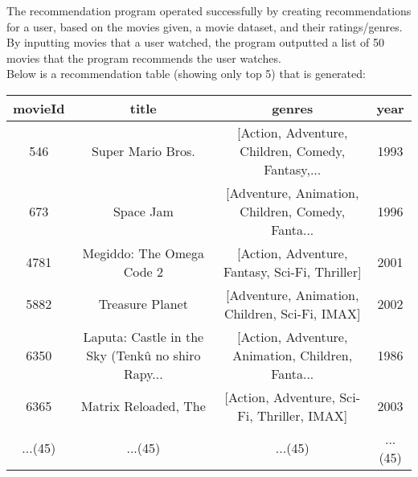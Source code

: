 \documentclass{article}
\begin{document}
The recommendation program operated successfully by creating recommendations for a user, based on the movies 
given, a movie dataset, and their ratings/genres. By inputting movies that a user watched, the program outputted
a list of 50 movies that the program recommends the user watches.\\
Below is a recommendation table (showing only top 5) that is generated: 
\begin{center}
    \begin{adjustwidth}{-3.5cm}{}
    \begin{tabular}{||c c c c||}
        \hline
        movieId & title & genres & year \\ [0.5ex] 
        \hline\hline
        546 & Super Mario Bros. & [Action, Adventure, Children, Comedy, Fantasy,... & 1993 \\ 
        \hline
        673 & Space Jam & [Adventure, Animation, Children, Comedy, Fanta... & 1996 \\ 
        \hline
        4781 & Megiddo: The Omega Code 2 & [Action, Adventure, Fantasy, Sci-Fi, Thriller] & 2001 \\ 
        \hline
        5882 & Treasure Planet & [Adventure, Animation, Children, Sci-Fi, IMAX] & 2002 \\ 
        \hline
        6350 & Laputa: Castle in the Sky (Tenkû no shiro Rapy... & [Action, Adventure, Animation, Children, Fanta... & 1986 \\ 
        \hline
        6365 & Matrix Reloaded, The & [Action, Adventure, Sci-Fi, Thriller, IMAX] & 2003 \\ [1ex] 
        \hline
        ...(45) & ...(45) & ...(45) & ...(45) \\
        \hline
    \end{tabular}
    \end{adjustwidth}
    \end{center}
\end{document}
